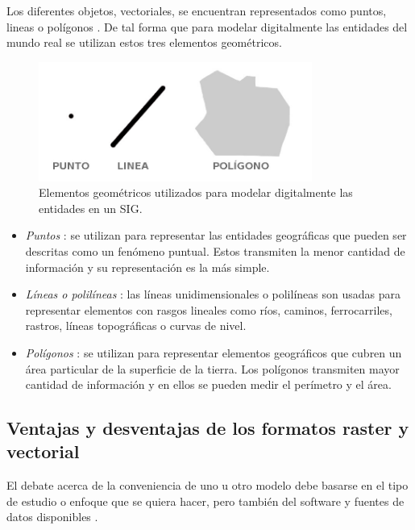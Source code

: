 Los diferentes objetos, vectoriales, se encuentran representados como puntos, lineas o polígonos
\citep{fAlonsoSig2006}. De tal forma que para modelar digitalmente las entidades del mundo real se
utilizan estos tres elementos geométricos.

\begin{figure}
\centering
\includegraphics[width=0.8\textwidth]{capitulo-2/graphics/dimensiones-datos.jpg}
\caption{\label{fig:sig-xyz} Elementos geométricos utilizados para modelar digitalmente las entidades en un SIG.}
\end{figure}

\begin{itemize}
    \item \textit{Puntos} : se utilizan para representar las entidades geográficas que pueden ser
    descritas como un fenómeno puntual. Estos transmiten la menor cantidad de información y su representación es la más simple.

    \item \textit{Líneas o polilíneas} : las líneas unidimensionales o polilíneas son usadas para
    representar elementos con rasgos lineales como ríos, caminos, ferrocarriles, rastros, líneas
    topográficas o curvas de nivel.

    \item \textit{Polígonos} : se utilizan para representar elementos geográficos que cubren un
    área particular de la superficie de la tierra. Los polígonos transmiten mayor cantidad de
    información y en ellos se pueden medir el perímetro y el área.
\end{itemize}

\subsection{Ventajas y desventajas de los formatos raster y vectorial}

El debate acerca de la conveniencia de uno u otro modelo debe basarse en el tipo de estudio o
enfoque que se quiera hacer, pero también del software y fuentes de datos disponibles
\citep{fAlonsoSig2006}.


